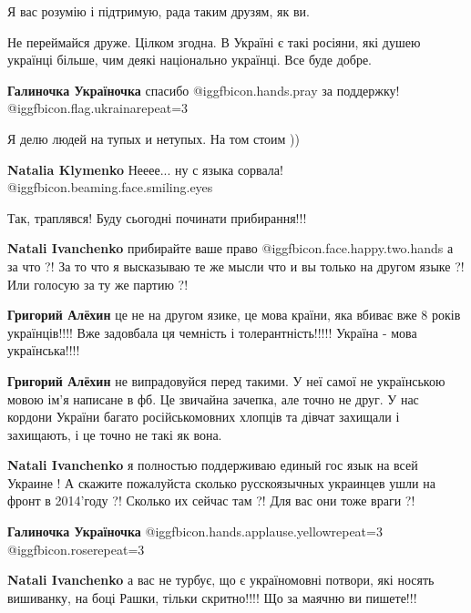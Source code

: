 \begin{itemize}
Я вас розумію і підтримую, рада таким друзям, як ви.


Не переймайся друже. Цілком згодна. В Україні є такі росіяни, які душею
українці більше, чим деякі національно українці. Все буде добре.

\begin{itemize} %
\textbf{Галиночка Україночка} спасибо  @igg{fbicon.hands.pray}  за поддержку! @igg{fbicon.flag.ukraina}{repeat=3}
\end{itemize} %

Я делю людей на тупых и нетупых. На том стоим ))

\begin{itemize} %
\textbf{Natalia Klymenko} Нееее... ну с языка сорвала! @igg{fbicon.beaming.face.smiling.eyes} 
\end{itemize} %

Так, траплявся!
Буду сьогодні починати прибирання!!!

\begin{itemize} %
\textbf{Natali Ivanchenko} прибирайте ваше право  @igg{fbicon.face.happy.two.hands}  а за что ?! За то что я высказываю те же мысли что и вы только на другом языке ?! Или голосую за ту же партию ?!

\textbf{Григорий Алёхин} це не на другом язике, це мова країни, яка вбиває вже 8 років українців!!!! Вже задовбала ця чемність і толерантність!!!!! Україна - мова українська!!!!

\textbf{Григорий Алёхин} не випрадовуйся перед такими. У неї самої не українською мовою ім'я написане в фб. Це звичайна зачепка, але точно не друг. У нас кордони України багато російськомовних хлопців та дівчат захищали і захищають, і це точно не такі як вона.

\textbf{Natali Ivanchenko} я полностью поддерживаю единый гос язык на всей Украине ! А скажите пожалуйста сколько русскоязычных украинцев ушли на фронт в 2014'году ?! Сколько их сейчас там ?! Для вас они тоже враги ?!

\textbf{Галиночка Україночка}  @igg{fbicon.hands.applause.yellow}{repeat=3}  @igg{fbicon.rose}{repeat=3} 

\textbf{Natali Ivanchenko} а вас не турбує, що є україномовні потвори, які носять вишиванку, на боці Рашки, тільки скритно!!!! Що за маячню ви пишете!!!


\end{itemize}
\end{itemize}
